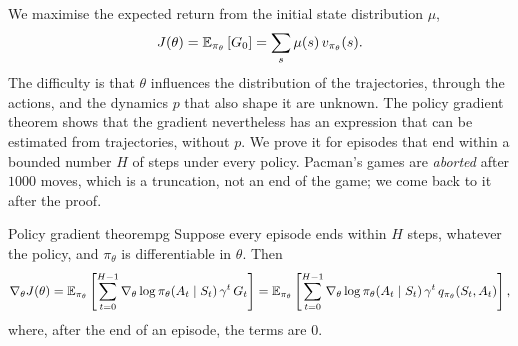We maximise the expected return from the initial state distribution
$\mu$,
\begin{equation}
  J(\theta) = \mathbb{E}_{\pi_\theta}\left[G_0\right]
  = \sum_s \mu(s)\, v_{\pi_\theta}(s).
\end{equation}
The difficulty is that $\theta$ influences the distribution of the
trajectories, through the actions, and the dynamics $p$ that also shape it
are unknown. The policy gradient theorem shows that the gradient
nevertheless has an expression that can be estimated from trajectories,
without $p$. We prove it for episodes that end within a bounded number $H$
of steps under every policy. Pacman's games are \emph{aborted} after $1000$
moves, which is a truncation, not an end of the game; we come back to it
after the proof.

\begin{theorem}{Policy gradient theorem}{pg}
  Suppose every episode ends within $H$ steps, whatever the policy, and
  $\pi_\theta$ is differentiable in $\theta$. Then
  \begin{equation}
    \label{eq:pg}
    \nabla_\theta J(\theta) = \mathbb{E}_{\pi_\theta}\left[ \sum_{t=0}^{H-1}
    \nabla_\theta \log \pi_\theta(A_t \mid S_t)\, \gamma^t\, G_t \right]
    = \mathbb{E}_{\pi_\theta}\left[ \sum_{t=0}^{H-1} \nabla_\theta \log
    \pi_\theta(A_t \mid S_t)\, \gamma^t\, q_{\pi_\theta}(S_t, A_t) \right],
  \end{equation}
  where, after the end of an episode, the terms are $0$.
\end{theorem}

